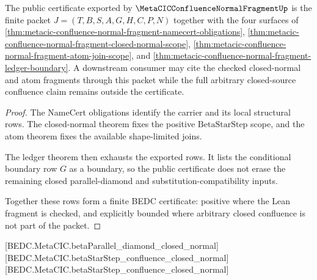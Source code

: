 \begin{theorem}
\label{thm:metacic-confluence-normal-fragment-public-certificate}
The public certificate exported by
$\MetaCICConfluenceNormalFragmentUp$ is the finite packet
$J=(T,B,S,A,G,H,C,P,N)$ together with the four surfaces of
\autoref{thm:metacic-confluence-normal-fragment-namecert-obligations},
\autoref{thm:metacic-confluence-normal-fragment-closed-normal-scope},
\autoref{thm:metacic-confluence-normal-fragment-atom-join-scope}, and
\autoref{thm:metacic-confluence-normal-fragment-ledger-boundary}. A downstream
consumer may cite the checked closed-normal and atom fragments through this
packet while the full arbitrary closed-source confluence claim remains outside
the certificate.
\end{theorem}
\begin{proof}
The NameCert obligations identify the carrier and its local structural rows.
The closed-normal theorem fixes the positive $\mathrm{BetaStarStep}$ scope, and
the atom theorem fixes the available shape-limited joins.

The ledger theorem then exhausts the exported rows. It lists the conditional
boundary row $G$ as a boundary, so the public certificate does not erase the
remaining closed parallel-diamond and substitution-compatibility inputs.

Together these rows form a finite BEDC certificate: positive where the Lean
fragment is checked, and explicitly bounded where arbitrary closed confluence is
not part of the packet.
\end{proof}

[BEDC.MetaCIC.betaParallel\_diamond\_closed\_normal]
[BEDC.MetaCIC.betaStarStep\_confluence\_closed\_normal]
[BEDC.MetaCIC.betaStarStep\_confluence\_closed\_normal]

